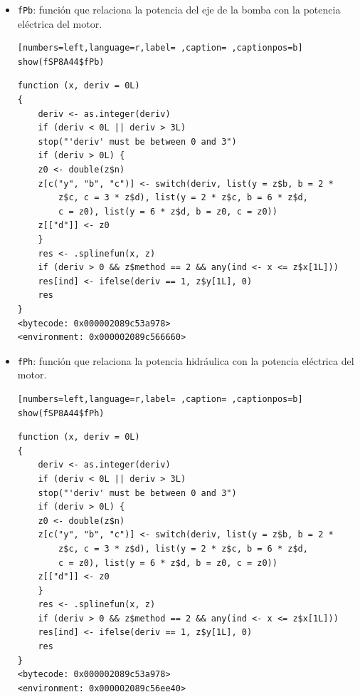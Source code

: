 \begin{itemize}
\begin{itemize}
\begin{verbatim}
function (x, deriv = 0L) 
{
    deriv <- as.integer(deriv)
    if (deriv < 0L || deriv > 3L) 
	stop("'deriv' must be between 0 and 3")
    if (deriv > 0L) {
	z0 <- double(z$n)
	z[c("y", "b", "c")] <- switch(deriv, list(y = z$b, b = 2 * 
	    z$c, c = 3 * z$d), list(y = 2 * z$c, b = 6 * z$d, 
	    c = z0), list(y = 6 * z$d, b = z0, c = z0))
	z[["d"]] <- z0
    }
    res <- .splinefun(x, z)
    if (deriv > 0 && z$method == 2 && any(ind <- x <= z$x[1L])) 
	res[ind] <- ifelse(deriv == 1, z$y[1L], 0)
    res
}
<bytecode: 0x000002089c53a978>
<environment: 0x000002089c53ee80>
\end{verbatim}

\item \texttt{fPb}: función que relaciona la potencia del eje de la bomba con la potencia eléctrica del motor.
\begin{lstlisting}[numbers=left,language=r,label= ,caption= ,captionpos=b]
show(fSP8A44$fPb)
\end{lstlisting}

\begin{verbatim}
function (x, deriv = 0L) 
{
    deriv <- as.integer(deriv)
    if (deriv < 0L || deriv > 3L) 
	stop("'deriv' must be between 0 and 3")
    if (deriv > 0L) {
	z0 <- double(z$n)
	z[c("y", "b", "c")] <- switch(deriv, list(y = z$b, b = 2 * 
	    z$c, c = 3 * z$d), list(y = 2 * z$c, b = 6 * z$d, 
	    c = z0), list(y = 6 * z$d, b = z0, c = z0))
	z[["d"]] <- z0
    }
    res <- .splinefun(x, z)
    if (deriv > 0 && z$method == 2 && any(ind <- x <= z$x[1L])) 
	res[ind] <- ifelse(deriv == 1, z$y[1L], 0)
    res
}
<bytecode: 0x000002089c53a978>
<environment: 0x000002089c566660>
\end{verbatim}

\item \texttt{fPh}: función que relaciona la potencia hidráulica con la potencia eléctrica del motor.
\begin{lstlisting}[numbers=left,language=r,label= ,caption= ,captionpos=b]
show(fSP8A44$fPh)
\end{lstlisting}

\begin{verbatim}
function (x, deriv = 0L) 
{
    deriv <- as.integer(deriv)
    if (deriv < 0L || deriv > 3L) 
	stop("'deriv' must be between 0 and 3")
    if (deriv > 0L) {
	z0 <- double(z$n)
	z[c("y", "b", "c")] <- switch(deriv, list(y = z$b, b = 2 * 
	    z$c, c = 3 * z$d), list(y = 2 * z$c, b = 6 * z$d, 
	    c = z0), list(y = 6 * z$d, b = z0, c = z0))
	z[["d"]] <- z0
    }
    res <- .splinefun(x, z)
    if (deriv > 0 && z$method == 2 && any(ind <- x <= z$x[1L])) 
	res[ind] <- ifelse(deriv == 1, z$y[1L], 0)
    res
}
<bytecode: 0x000002089c53a978>
<environment: 0x000002089c56ee40>
\end{verbatim}


\end{itemize}
\end{itemize}
